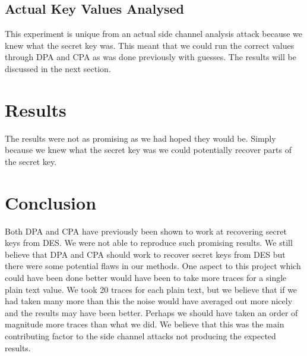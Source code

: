 \subsection{Actual Key Values Analysed}
  This experiment is unique from an actual side channel analysis attack because we knew what the secret key was.  This meant that we could run the correct values through DPA and CPA as was done previously with guesses.  The results will be discussed in the next section.

\section{Results}\label{res}
  The results were not as promising as we had hoped they would be.  Simply because we knew what the secret key was we could potentially recover parts of the secret key.

\section{Conclusion}\label{sec::conclusion} 


	Both DPA and CPA have previously been shown to work at recovering secret keys from DES.  We were not able to reproduce such promising results.  We still believe that DPA and CPA should work to recover secret keys from DES but there were some potential flaws in our methods.
  One aspect to this project which could have been done better would have been to take more traces for a single plain text value.  We took 20 traces for each plain text, but we believe that if we had taken many more than this the noise would have averaged out more nicely and the results may have been better.  Perhaps we should have taken an order of magnitude more traces than what we did.  We believe that this was the main contributing factor to the side channel attacks not producing the expected results.












